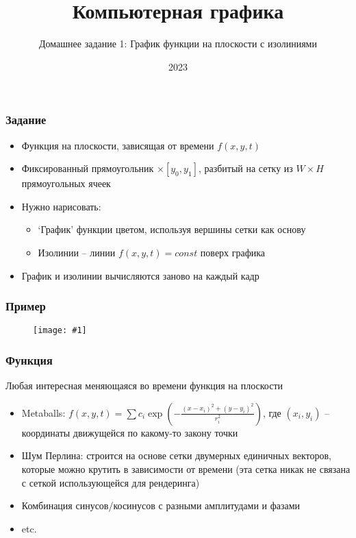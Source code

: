 \documentclass{beamer}
\title{Компьютерная графика}
\subtitle{Домашнее задание 1: График функции на плоскости с изолиниями}
\date{2023}
\newcommand{\slideimage}[1]{
  \begin{figure}
    \begin{adjustbox}{width=\textwidth, totalheight=\textheight-2\baselineskip-2\baselineskip,keepaspectratio}
      \texttt{[image: \#1]}
    \end{adjustbox}
  \end{figure}
}
\begin{document}
\frame{\titlepage}

\begin{frame}[fragile]
\frametitle{Задание}
\begin{itemize}
\item Функция на плоскости, зависящая от времени \begin{math}f(x, y, t)\end{math}
\pause
\item Фиксированный прямоугольник \begin{math}[x_0, x_1] \times [y_0, y_1]\end{math}, разбитый на сетку из \begin{math}W\times H\end{math} прямоугольных ячеек
\pause
\item Нужно нарисовать:
\begin{itemize}
\item `График' функции цветом, используя вершины сетки как основу
\pause
\item Изолинии -- линии \begin{math}f(x,y,t) = const\end{math} поверх графика
\end{itemize}
\pause
\item График и изолинии вычисляются заново на каждый кадр
\end{itemize}
\end{frame}

\begin{frame}[fragile]
\frametitle{Пример}
\slideimage{example-plot.png}
\end{frame}

\begin{frame}[fragile]
\frametitle{Функция}
Любая интересная меняющаяся во времени функция на плоскости
\begin{itemize}
\item Metaballs: \begin{math}f(x,y,t) = \sum c_i\exp\left(-\frac{(x-x_i)^2+(y-y_i)^2}{r_i^2}\right)\end{math}, где \begin{math}(x_i, y_i)\end{math} -- координаты движущейся по какому-то закону точки
\pause
\item Шум Перлина: строится на основе сетки двумерных единичных векторов, которые можно крутить в зависимости от времени (эта сетка никак не связана с сеткой использующейся для рендеринга)
\pause
\item Комбинация синусов/косинусов с разными амплитудами и фазами
\pause
\item etc.
\end{itemize}
\end{frame}
\end{document}
